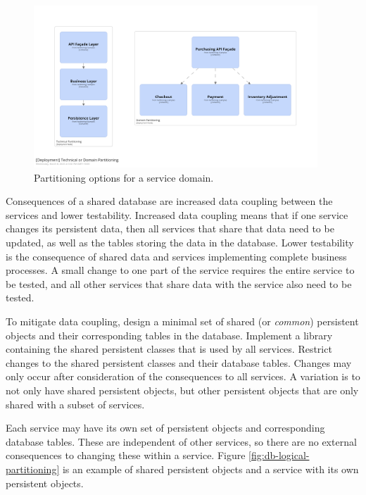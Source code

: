 \begin{figure}[h!]
    \centering
    \includegraphics[trim=197 197 197 198,clip,width=0.95\textwidth]{diagrams/service-partitions.png}
    \vspace{-7pt}
    \caption{Partitioning options for a service domain.}
    \label{fig:service-partitions}
\end{figure}

Consequences of a shared database are increased data coupling between the services and lower testability.
Increased data coupling means that if one service changes its persistent data,
then all services that share that data need to be updated, as well as the tables storing the data in the database.
Lower testability is the consequence of shared data and services implementing complete business processes.
A small change to one part of the service requires the entire service to be tested,
and all other services that share data with the service also need to be tested.

To mitigate data coupling, design a minimal set of shared (or \emph{common}) persistent objects and their corresponding tables in the database.
Implement a library containing the shared persistent classes that is used by all services.
Restrict changes to the shared persistent classes and their database tables.
Changes may only occur after consideration of the consequences to all services.
A variation is to not only have shared persistent objects,
but other persistent objects that are only shared with a subset of services.

Each service may have its own set of persistent objects and corresponding database tables.
These are independent of other services, so there are no external consequences to changing these within a service.
Figure \ref{fig:db-logical-partitioning} is an example of shared persistent objects and a service with its own persistent objects.

